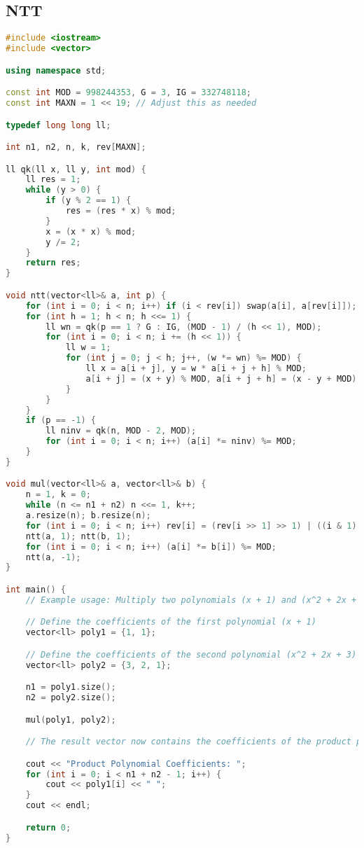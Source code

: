 \subsection{NTT}
    \begin{lstlisting}[language=c++]
#include <iostream>
#include <vector>

using namespace std;

const int MOD = 998244353, G = 3, IG = 332748118;
const int MAXN = 1 << 19; // Adjust this as needed

typedef long long ll;

int n1, n2, n, k, rev[MAXN];

ll qk(ll x, ll y, int mod) {
    ll res = 1;
    while (y > 0) {
        if (y % 2 == 1) {
            res = (res * x) % mod;
        }
        x = (x * x) % mod;
        y /= 2;
    }
    return res;
}

void ntt(vector<ll>& a, int p) {
    for (int i = 0; i < n; i++) if (i < rev[i]) swap(a[i], a[rev[i]]);
    for (int h = 1; h < n; h <<= 1) {
        ll wn = qk(p == 1 ? G : IG, (MOD - 1) / (h << 1), MOD);
        for (int i = 0; i < n; i += (h << 1)) {
            ll w = 1;
            for (int j = 0; j < h; j++, (w *= wn) %= MOD) {
                ll x = a[i + j], y = w * a[i + j + h] % MOD;
                a[i + j] = (x + y) % MOD, a[i + j + h] = (x - y + MOD) % MOD;
            }
        }
    }
    if (p == -1) {
        ll ninv = qk(n, MOD - 2, MOD);
        for (int i = 0; i < n; i++) (a[i] *= ninv) %= MOD;
    }
}

void mul(vector<ll>& a, vector<ll>& b) {
    n = 1, k = 0;
    while (n <= n1 + n2) n <<= 1, k++;
    a.resize(n); b.resize(n);
    for (int i = 0; i < n; i++) rev[i] = (rev[i >> 1] >> 1) | ((i & 1) << (k - 1));
    ntt(a, 1); ntt(b, 1);
    for (int i = 0; i < n; i++) (a[i] *= b[i]) %= MOD;
    ntt(a, -1);
}

int main() {
    // Example usage: Multiply two polynomials (x + 1) and (x^2 + 2x + 3)

    // Define the coefficients of the first polynomial (x + 1)
    vector<ll> poly1 = {1, 1};

    // Define the coefficients of the second polynomial (x^2 + 2x + 3)
    vector<ll> poly2 = {3, 2, 1};

    n1 = poly1.size();
    n2 = poly2.size();

    mul(poly1, poly2);

    // The result vector now contains the coefficients of the product polynomial

    cout << "Product Polynomial Coefficients: ";
    for (int i = 0; i < n1 + n2 - 1; i++) {
        cout << poly1[i] << " ";
    }
    cout << endl;

    return 0;
}
    \end{lstlisting}